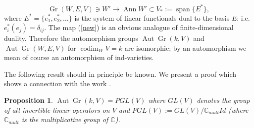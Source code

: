 \documentclass[11pt]{amsart}
\numberwithin{equation}{section}
\theoremstyle{plain}
\newtheorem{prop}{Proposition}
\theoremstyle{remark}
\theoremstyle{remark}
\theoremstyle{construction}
\begin{document}
\begin{equation}\label{new}\tag{1}
\operatorname{Gr}(W,E,V)\ni W'  \to \operatorname{Ann}W'\subset V_* := \operatorname{span}\{E^*\},
\end{equation}	
where $E^*=\{e_1^*,e_2^*,\dots\}$ is the system of linear functionals dual to the basis $E$: i.e. $e^*_i(e_j)=\delta_{ij}$. The map (\ref{new}) is an obvious analogue of finite-dimensional duality. Therefore the automorphism groups $\operatorname{Aut}\operatorname{Gr}(k,V)$ and $\operatorname{Aut}\operatorname{Gr}(W,E,V)$ for $\operatorname{codim}_W V=k$ are isomorphic; by an automorphism we mean of course an automorphism of ind-varieties.

The following result should in principle be known. We present a proof which shows a connection with the work \cite{PT}.

\begin{prop}
$\operatorname{Aut} \operatorname{Gr}(k,V)=PGL(V)$ where $GL(V)$ denotes the group of all invertible linear operators on $V$ and $PGL(V):= GL(V)/\mathbb{C}_{mult}Id$ (where $\mathbb C_{mult}$ is the multiplicative group of $\mathbb C$).
\end{prop}
\end{document}

